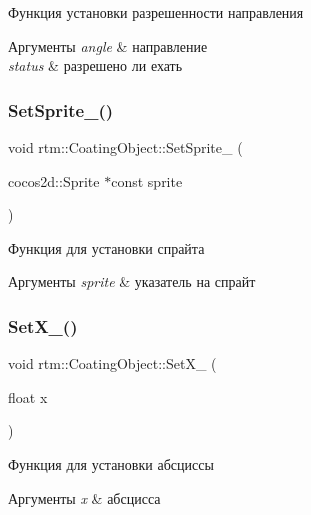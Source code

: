 Функция установки разрешенности направления 
\begin{DoxyParams}{Аргументы}
{\em angle} & направление \\
\hline
{\em status} & разрешено ли ехать \\
\hline
\end{DoxyParams}
\mbox{\label{classrtm_1_1_coating_object_a1d0227cd023ce6e6bd475194b5cbfe2d}} 
\subsubsection{\texorpdfstring{Set\+Sprite\+\_\+()}{SetSprite\_()}}
{\footnotesize\ttfamily void rtm\+::\+Coating\+Object\+::\+Set\+Sprite\+\_\+ (\begin{DoxyParamCaption}\item[{cocos2d\+::\+Sprite $\ast$const}]{sprite }\end{DoxyParamCaption})\hspace{0.3cm}{\ttfamily [protected]}}

Функция для установки спрайта 
\begin{DoxyParams}{Аргументы}
{\em sprite} & указатель на спрайт \\
\hline
\end{DoxyParams}
\mbox{\label{classrtm_1_1_coating_object_a5bb5e11400d05dc2d50bfbd2021d3aac}} 
\subsubsection{\texorpdfstring{Set\+X\+\_\+()}{SetX\_()}}
{\footnotesize\ttfamily void rtm\+::\+Coating\+Object\+::\+Set\+X\+\_\+ (\begin{DoxyParamCaption}\item[{float}]{x }\end{DoxyParamCaption})\hspace{0.3cm}{\ttfamily [private]}}

Функция для установки абсциссы 
\begin{DoxyParams}{Аргументы}
{\em x} & абсцисса \\
\hline
\end{DoxyParams}
\mbox{\label{classrtm_1_1_coating_object_a3f67f750f8bf4b87a55655018c0c8d71}} 
